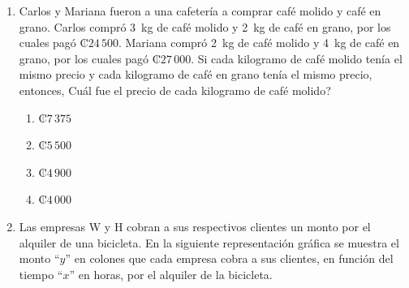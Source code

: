 \documentclass[12pt]{article}
\begin{document}
\begin{enumerate}[label=\textbf{\arabic*.}, itemsep=2.5cm]
\begin{enumerate}[label=\Alph*)]
  \item 15
  \item 50
  \item 107
  \item 12
\end{enumerate}

\Needspace{0.48\textheight}
\item
Carlos y Mariana fueron a una cafeter\'ia a comprar caf\'e molido y caf\'e en grano. Carlos compr\'o 3~kg de caf\'e molido y 2~kg de caf\'e en grano, por los cuales pag\'o \mbox{₡$24\,500$}. Mariana compr\'o 2~kg de caf\'e molido y 4~kg de caf\'e en grano, por los cuales pag\'o \mbox{₡$27\,000$}. Si cada kilogramo de caf\'e molido ten\'ia el mismo precio y cada kilogramo de caf\'e en grano ten\'ia el mismo precio, entonces, \textquestiondown Cu\'al fue el precio de cada kilogramo de caf\'e molido?

\begin{enumerate}[label=\Alph*)]
  \item \mbox{₡$7\,375$}
  \item \mbox{₡$5\,500$}
  \item \mbox{₡$4\,900$}
  \item \mbox{₡$4\,000$}
\end{enumerate}

\Needspace{0.92\textheight}
\item
Las empresas W y H cobran a sus respectivos clientes un monto por el alquiler de una bicicleta. En la siguiente representaci\'on gr\'afica se muestra el monto ``$y$'' en colones que cada empresa cobra a sus clientes, en funci\'on del tiempo ``$x$'' en horas, por el alquiler de la bicicleta.

\begin{center}
\end{center}
\end{enumerate}
\end{document}
